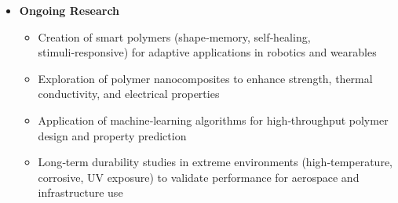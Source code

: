\documentclass[11pt,a4paper]{article}
\begin{document}
\begin{itemize}
\item \textbf{Ongoing Research}
  \begin{itemize}
\item Creation of smart polymers (shape‑memory, self‑healing, stimuli‑responsive) for adaptive applications in robotics and wearables
\item Exploration of polymer nanocomposites to enhance strength, thermal conductivity, and electrical properties
\item Application of machine‑learning algorithms for high‑throughput polymer design and property prediction
\item Long‑term durability studies in extreme environments (high‑temperature, corrosive, UV exposure) to validate performance for aerospace and infrastructure use
  \end{itemize}
\end{itemize}
\end{document}
